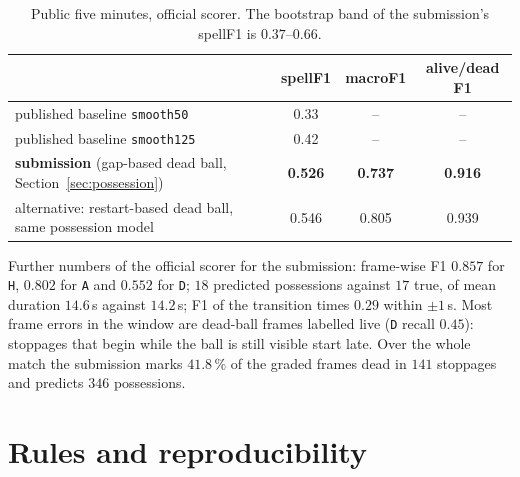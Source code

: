 \documentclass[11pt,a4paper]{article}
\begin{document}
\begin{table}[ht]
\centering
\begin{tabular}{@{}lccc@{}}
\toprule
 & spellF1 & macroF1 & alive/dead F1 \\ \midrule
published baseline \texttt{smooth50}  & 0.33 & -- & -- \\
published baseline \texttt{smooth125} & 0.42 & -- & -- \\
\textbf{submission} (gap-based dead ball, Section~\ref{sec:possession}) & \textbf{0.526} & \textbf{0.737} & \textbf{0.916} \\
alternative: restart-based dead ball, same possession model & 0.546 & 0.805 & 0.939 \\ \bottomrule
\end{tabular}
\caption{Public five minutes, official scorer. The bootstrap band of the submission's spellF1
is $0.37$--$0.66$.}
\end{table}

Further numbers of the official scorer for the submission: frame-wise F1 $0.857$ for
\texttt{H}, $0.802$ for \texttt{A} and $0.552$ for \texttt{D}; $18$ predicted possessions against
$17$ true, of mean duration $14.6$\,s against $14.2$\,s; F1 of the transition times $0.29$ within
$\pm 1$\,s. Most frame errors in the window are dead-ball frames labelled live (\texttt{D} recall
$0.45$): stoppages that begin while the ball is still visible start late. Over the whole match
the submission marks $41.8\,\%$ of the graded frames dead in $141$ stoppages and predicts $346$
possessions.

\section{Rules and reproducibility}\label{sec:rules}
\end{document}
